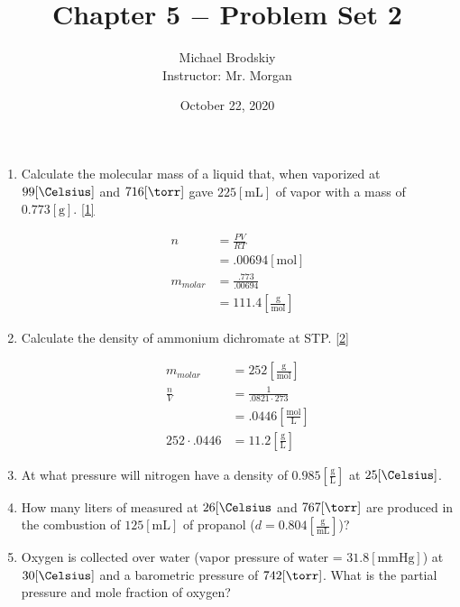 \documentclass[12pt]{article}
\title{Chapter 5 $-$ Problem Set 2}
\date{October 22, 2020}
\author{Michael Brodskiy\\ \small Instructor: Mr. Morgan}
\begin{document}
\maketitle

\begin{enumerate}

  \item Calculate the molecular mass of a liquid that, when vaporized at $99[\si{\Celsius}]$ and $716[\si{\torr}]$ gave $225[\si{\milli\liter}]$ of vapor with a mass of $0.773[\si{\gram}]$. \eqref{1}

    \begin{equation}
      \begin{split}
        n&=\frac{PV}{RT}\\
        &=.00694[\si{\mole}]\\
        m_{molar}&=\frac{.773}{.00694}\\
        &=111.4\left[ \frac{\si{\gram}}{\si{\mole}} \right]
      \end{split}
      \label{1}
    \end{equation}

  \item Calculate the density of ammonium dichromate at STP. \eqref{2}

    \begin{equation}
      \begin{split}
        m_{molar}&=252\left[ \frac{\si{\gram}}{\si{\mole}} \right]\\
        \frac{n}{V}&=\frac{1}{.0821\cdot273}\\
        &=.0446\left[ \frac{\si{\mole}}{\si{\liter}} \right]\\
        252\cdot.0446&=11.2\left[ \frac{\si{\gram}}{\si{\liter}} \right]
      \end{split}
      \label{2}
    \end{equation}

  \item At what pressure will nitrogen have a density of $0.985\left[ \frac{\si{\gram}}{\si{\liter}} \right]$ at $25[\si{\Celsius}]$.

  \item How many liters of  measured at $26[\si{\Celsius}$ and $767[\si{\torr}]$ are produced in the combustion of $125[\si{\milli\liter}]$ of propanol ($d = 0.804\left[ \frac{\si{\gram}}{\si{\milli\liter}} \right]$)?

  \item Oxygen is collected over water (vapor pressure of water = $31.8[\si{\mmHg}]$) at $30[\si{\Celsius}]$ and a barometric pressure of $742[\si{\torr}]$.  What is the partial pressure and mole fraction of oxygen? 


\end{enumerate}
\end{document}

